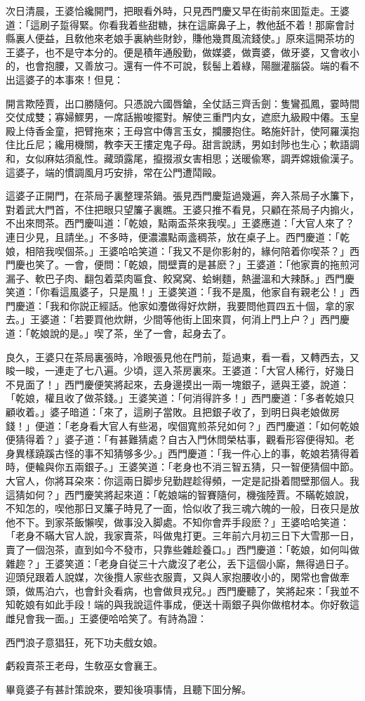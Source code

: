 次日清晨，王婆恰纔開門，把眼看外時，只見西門慶又早在街前來囬踅走。王婆道：「這刷子踅得緊。你看我着些甜糖，抹在這廝鼻子上，教他舐不着！那廝會討縣裏人便益，且敎他來老娘手裏納些財鈔，賺他幾貫風流錢使。」原來這開茶坊的王婆子，也不是守本分的。便是積年通殷勤，做媒婆，做賣婆，做牙婆，又會收小的，也會抱腰，又善放刁。還有一件不可說，䯼髻上着綠，陽臘灌腦袋。端的看不出這婆子的本事來！但見：

\begin{myquote}
開言欺陸賈，出口勝隨何。只憑說六國唇鎗，全仗話三齊舌劍：隻鸞孤鳳，霎時間交仗成雙；寡婦鰥男，一席話搬唆擺對。解使三重門内女，遮麽九級殿中僊。玉皇殿上侍香金童，把臂拖來；王母宫中傳言玉女，攔腰抱住。略施奸計，使阿羅漢抱住比丘尼；纔用機關，教李天王摟定鬼子母。甜言說誘，男如封陟也生心；軟語調和，女似麻姑須亂性。藏頭露尾，攛掇淑女害相思；送暖偸寒，調弄嫦娥偸漢子。這婆子，端的慣調風月巧安排，常在公門遭鬦毆。
\end{myquote}

這婆子正開門，在茶局子裏整理茶鍋。張見西門慶踅過幾遍，奔入茶局子水簾下，對着武大門首，不住把眼只望簾子裏瞧。王婆只推不看見，只顧在茶局子内搧火，不出來問茶。西門慶叫道：「乾娘，點兩盃茶來我喫。」王婆應道：「大官人來了？連日少見，且請坐。」不多時，便濃濃點兩盞稠茶，放在桌子上。西門慶道：「乾娘，相陪我喫個茶。」王婆哈哈笑道：「我又不是你影射的，緣何陪着你喫茶？」西門慶也笑了。一會，便問：「乾娘，間壁賣的是甚麽？」王婆道：「他家賣的拖煎河漏子、軟巴子肉、翻包着菜肉匾食、餃窝窝、蛤蜊麵，熱盪溫和大辣酥。」西門慶笑道：「你看這風婆子，只是風！」王婆笑道：「我不是風，他家自有親老公！」西門慶道：「我和你説正經話。他家如灋做得好炊餅，我要問他買四五十個，拿的家去。」王婆道：「若要買他炊餅，少間等他街上囬來買，何消上門上户？」西門慶道：「乾娘說的是。」喫了茶，坐了一會，起身去了。

良久，王婆只在茶局裏張時，冷眼張見他在門前，踅過東，看一看，又轉西去，又睃一睃，一連走了七八遍。少頃，逕入茶房裏來。王婆道：「大官人稀行，好幾日不見面了！」西門慶便笑將起來，去身邊摸出一兩一塊銀子，遞與王婆，說道：「乾娘，權且收了做茶錢。」王婆笑道：「何消得許多！」西門慶道：「多者乾娘只顧收着。」婆子暗道：「來了，這刷子當敗。且把銀子收了，到明日與老娘做房錢！」便道：「老身看大官人有些渴，喫個寬煎茶兒如何？」西門慶道：「如何乾娘便猜得着？」婆子道：「有甚難猜處？自古入門休問榮枯事，觀看形容便得知。老身異樣蹺蹊古怪的事不知猜够多少。」西門慶道：「我一件心上的事，乾娘若猜得着時，便輸與你五兩銀子。」王婆笑道：「老身也不消三智五猜，只一智便猜個中節。大官人，你將耳朶來：你這兩日脚步兒勤趕趁得頻，一定是記掛着間壁那個人。我這猜如何？」西門慶笑將起來道：「乾娘端的智賽隨何，機強陸賈。不瞞乾娘說，不知怎的，喫他那日叉簾子時見了一面，恰似收了我三魂六魄的一般，日夜只是放他不下。到家茶飯懶喫，做事没入脚處。不知你會弄手段麽？」王婆哈哈笑道：「老身不瞞大官人說，我家賣茶，呌做鬼打更。三年前六月初三日下大雪那一日，賣了一個泡茶，直到如今不發市，只靠些雜趁養口。」西門慶道：「乾娘，如何叫做雜趂？」王婆笑道：「老身自従三十六歲沒了老公，丢下這個小廝，無得過日子。迎頭兒跟着人說媒，次後攬人家些衣服賣，又與人家抱腰收小的，閑常也會做牽頭，做馬泊六，也會針灸看病，也會做貝戎兒。」西門慶聽了，笑將起來：「我並不知乾娘有如此手段！端的與我說這件事成，便送十兩銀子與你做棺材本。你好敎這雌兒會我一面。」王婆便哈哈笑了。有詩為證：

\begin{myquote}
西門浪子意猖狂，死下功夫戲女娘。

虧殺賣茶王老母，生敎巫女會襄王。
\end{myquote}

畢竟婆子有甚計策說來，要知後項事情，且聽下囬分解。

